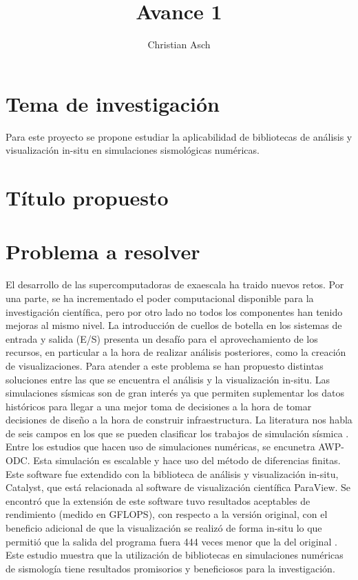 \documentclass{article}
\begin{document}
\title{Avance 1}
\author{Christian Asch}
\date{}
\maketitle

\section{Tema de investigación}
Para este proyecto se propone estudiar la aplicabilidad de bibliotecas de análisis y visualización in-situ en simulaciones sismológicas numéricas.
\section{Título propuesto}
\section{Problema a resolver}
El desarrollo de las supercomputadoras de exaescala ha traido nuevos retos. Por una parte, se ha incrementado el poder computacional disponible para la investigación científica, pero por otro lado no todos los componentes han tenido mejoras al mismo nivel. La introducción de cuellos de botella en los sistemas de entrada y salida (E/S) presenta un desafío para el aprovechamiento de los recursos, en particular a la hora de realizar análisis posteriores, como la creación de visualizaciones. Para atender a este problema se han propuesto distintas soluciones entre las que se encuentra el análisis y la visualización in-situ. \cite{akira_kageyama_approach_2014}
Las simulaciones sísmicas son de gran interés ya que permiten suplementar los datos históricos para llegar a una mejor toma de decisiones a la hora de tomar decisiones de diseño a la hora de construir infraestructura. La literatura nos habla de seis campos en los que se pueden clasificar los trabajos de simulación sísmica \cite{poursartip_large-scale_2020}. Entre los estudios que hacen uso de simulaciones numéricas, se encunetra AWP-ODC. Esta simulación es escalable y hace uso del método de diferencias finitas. Este software fue extendido con la biblioteca de análisis y visualización in-situ, Catalyst, que está relacionada al software de visualización científica ParaView. Se encontró que la extensión de este software tuvo resultados aceptables de rendimiento (medido en GFLOPS), con respecto a la versión original, con el beneficio adicional de que la visualización se realizó de forma in-situ lo que permitió que la salida del programa fuera 444 veces menor que la del original \cite{mu_-situ_2019}. Este estudio muestra que la utilización de bibliotecas en simulaciones numéricas de sismología tiene resultados promisorios y beneficiosos para la investigación.
\end{document}
